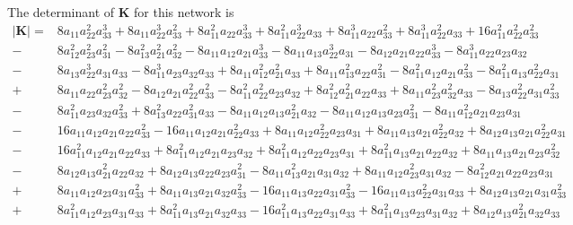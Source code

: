 \documentclass{article}
\begin{document}
The determinant of $\mathbf{K}$ for this network is
\begin{equation}
\begin{aligned}
|\mathbf{K}| = & 8 a_{11} a_{22}^{2} a_{33}^{3} + 8 a_{11} a_{22}^{3} a_{33}^{2} + 8 a_{11}^{2} a_{22} a_{33}^{3} + 8 a_{11}^{2} a_{22}^{3} a_{33} + 8 a_{11}^{3} a_{22} a_{33}^{2} + 8 a_{11}^{3} a_{22}^{2} a_{33} + 16 a_{11}^{2} a_{22}^{2} a_{33}^{2} \\
-&8 a_{12}^{2} a_{23}^{2} a_{31}^{2} - 8 a_{13}^{2} a_{21}^{2} a_{32}^{2} - 8 a_{11} a_{12} a_{21} a_{33}^{3} - 8 a_{11} a_{13} a_{22}^{3} a_{31} - 8 a_{12} a_{21} a_{22} a_{33}^{3} - 8 a_{11}^{3} a_{22} a_{23} a_{32} \\
-&8 a_{13} a_{22}^{3} a_{31} a_{33} - 8 a_{11}^{3} a_{23} a_{32} a_{33} + 8 a_{11} a_{12}^{2} a_{21}^{2} a_{33} + 8 a_{11} a_{13}^{2} a_{22} a_{31}^{2} - 8 a_{11}^{2} a_{12} a_{21} a_{33}^{2} - 8 a_{11}^{2} a_{13} a_{22}^{2} a_{31} \\
+&8 a_{11} a_{22} a_{23}^{2} a_{32}^{2} - 8 a_{12} a_{21} a_{22}^{2} a_{33}^{2} - 8 a_{11}^{2} a_{22}^{2} a_{23} a_{32} + 8 a_{12}^{2} a_{21}^{2} a_{22} a_{33} + 8 a_{11} a_{23}^{2} a_{32}^{2} a_{33} - 8 a_{13} a_{22}^{2} a_{31} a_{33}^{2} \\
-&8 a_{11}^{2} a_{23} a_{32} a_{33}^{2} + 8 a_{13}^{2} a_{22} a_{31}^{2} a_{33} - 8 a_{11} a_{12} a_{13} a_{21}^{2} a_{32} - 8 a_{11} a_{12} a_{13} a_{23} a_{31}^{2} - 8 a_{11} a_{12}^{2} a_{21} a_{23} a_{31} \\
-&16 a_{11} a_{12} a_{21} a_{22} a_{33}^{2} - 16 a_{11} a_{12} a_{21} a_{22}^{2} a_{33} + 8 a_{11} a_{12} a_{22}^{2} a_{23} a_{31} + 8 a_{11} a_{13} a_{21} a_{22}^{2} a_{32} + 8 a_{12} a_{13} a_{21} a_{22}^{2} a_{31} \\
-&16 a_{11}^{2} a_{12} a_{21} a_{22} a_{33} + 8 a_{11}^{2} a_{12} a_{21} a_{23} a_{32} + 8 a_{11}^{2} a_{12} a_{22} a_{23} a_{31} + 8 a_{11}^{2} a_{13} a_{21} a_{22} a_{32} + 8 a_{11} a_{13} a_{21} a_{23} a_{32}^{2} \\
-&8 a_{12} a_{13} a_{21}^{2} a_{22} a_{32} + 8 a_{12} a_{13} a_{22} a_{23} a_{31}^{2} - 8 a_{11} a_{13}^{2} a_{21} a_{31} a_{32} + 8 a_{11} a_{12} a_{23}^{2} a_{31} a_{32} - 8 a_{12}^{2} a_{21} a_{22} a_{23} a_{31} \\
+&8 a_{11} a_{12} a_{23} a_{31} a_{33}^{2} + 8 a_{11} a_{13} a_{21} a_{32} a_{33}^{2} - 16 a_{11} a_{13} a_{22} a_{31} a_{33}^{2} - 16 a_{11} a_{13} a_{22}^{2} a_{31} a_{33} + 8 a_{12} a_{13} a_{21} a_{31} a_{33}^{2} \\
+&8 a_{11}^{2} a_{12} a_{23} a_{31} a_{33} + 8 a_{11}^{2} a_{13} a_{21} a_{32} a_{33} - 16 a_{11}^{2} a_{13} a_{22} a_{31} a_{33} + 8 a_{11}^{2} a_{13} a_{23} a_{31} a_{32} + 8 a_{12} a_{13} a_{21}^{2} a_{32} a_{33} \\

\end{aligned}
\end{equation}
\end{document}
